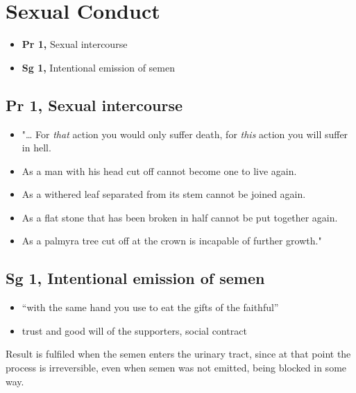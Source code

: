 \chapter{Sexual Conduct}

\begin{itemize}
\tightlist
\item
  \textbf{Pr 1,} Sexual intercourse
\item
  \textbf{Sg 1,} Intentional emission of semen
\end{itemize}

\section{Pr 1, Sexual intercourse}


\begin{itemize}
\tightlist
\item
  "\ldots{} For \emph{that} action you would only suffer death, for
  \emph{this} action you will suffer in hell.
\item
  As a man with his head cut off cannot become one to live again.
\item
  As a withered leaf separated from its stem cannot be joined again.
\item
  As a flat stone that has been broken in half cannot be put together
  again.
\item
  As a palmyra tree cut off at the crown is incapable of further
  growth."
\end{itemize}

\clearpage

\section{Sg 1, Intentional emission of semen}


\begin{itemize}
\tightlist
\item
  ``with the same hand you use to eat the gifts of the faithful''
\item
  trust and good will of the supporters, social contract
\end{itemize}

Result is fulfiled when the semen enters the urinary tract, since at
that point the process is irreversible, even when semen was not emitted,
being blocked in some way.

